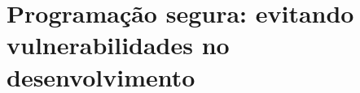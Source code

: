 \chapter{Programação segura: evitando vulnerabilidades no desenvolvimento}
\label{chap:programacao_segura}
